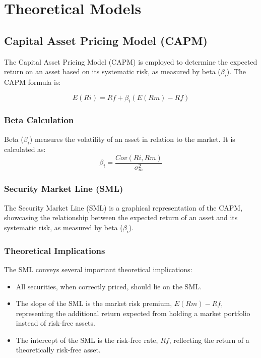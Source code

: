 \section{Theoretical Models}

\subsection{Capital Asset Pricing Model (CAPM)}
The Capital Asset Pricing Model (CAPM) is employed to determine the expected return on an asset based on its systematic risk, as measured by beta ($\beta_i$). The CAPM formula is:

\begin{equation}
E(Ri) = Rf + \beta_i(E(Rm) - Rf)
\end{equation}

\subsubsection{Beta Calculation}
Beta ($\beta_i$) measures the volatility of an asset in relation to the market. It is calculated as:
\begin{equation}
\beta_i = \frac{Cov(Ri, Rm)}{\sigma^2_m}
\end{equation}

\subsubsection{Security Market Line (SML)}
The Security Market Line (SML) is a graphical representation of the CAPM, showcasing the relationship between the expected return of an asset and its systematic risk, as measured by beta ($\beta_i$).

\subsubsection{Theoretical Implications}
The SML conveys several important theoretical implications:
\begin{itemize}
    \item All securities, when correctly priced, should lie on the SML.
    \item The slope of the SML is the market risk premium, $E(Rm) - Rf$, representing the additional return expected from holding a market portfolio instead of risk-free assets.
    \item The intercept of the SML is the risk-free rate, $Rf$, reflecting the return of a theoretically risk-free asset.
\end{itemize}



